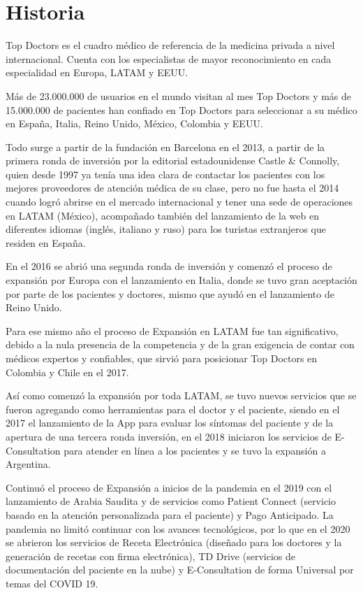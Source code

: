 \section{Historia}
Top Doctors es el cuadro médico de referencia de la medicina privada a nivel internacional. Cuenta con los especialistas de mayor reconocimiento en cada especialidad en Europa, LATAM y EEUU.

Más de 23.000.000 de usuarios en el mundo visitan al mes Top Doctors y más de 15.000.000 de pacientes han confiado en Top Doctors para seleccionar a su médico en España, Italia, Reino Unido, México, Colombia y EEUU.

Todo surge a partir de la fundación en Barcelona en el 2013, a partir de la primera ronda de inversión por la editorial estadounidense Castle \& Connolly, quien desde 1997 ya tenía una idea clara de contactar los pacientes con los mejores proveedores de atención médica de su clase, pero no fue hasta el 2014 cuando logró abrirse en el mercado internacional y tener una sede de operaciones en LATAM (México), acompañado también del lanzamiento de la web en diferentes idiomas (inglés, italiano y ruso) para los turistas extranjeros que residen en España.

En el 2016 se abrió una segunda ronda de inversión y comenzó el proceso de expansión por Europa con el lanzamiento en Italia, donde se tuvo gran aceptación por parte de los pacientes y doctores, mismo que ayudó en el lanzamiento de Reino Unido.

Para ese mismo año el proceso de Expansión en LATAM fue tan significativo, debido a la nula presencia de la competencia y de la gran exigencia de contar con médicos expertos y confiables, que sirvió para posicionar Top Doctors en Colombia y Chile en el 2017.

Así como comenzó la expansión por toda LATAM, se tuvo nuevos servicios que se fueron agregando como herramientas para el doctor y el paciente, siendo en el 2017 el lanzamiento de la App para evaluar los síntomas del paciente y de la apertura de una tercera ronda inversión, en el 2018 iniciaron los servicios de E-Consultation para atender en línea a los pacientes y se tuvo la expansión a Argentina.

Continuó el proceso de Expansión a inicios de la pandemia en el 2019 con el lanzamiento de Arabia Saudita y de servicios como Patient Connect (servicio basado en la atención personalizada para el paciente) y Pago Anticipado. La pandemia no limitó continuar con los avances tecnológicos, por lo que en el 2020 se abrieron los servicios de Receta Electrónica (diseñado para los doctores y la generación de recetas con firma electrónica), TD Drive (servicios de documentación del paciente en la nube) y E-Consultation de forma Universal por temas del COVID 19.

